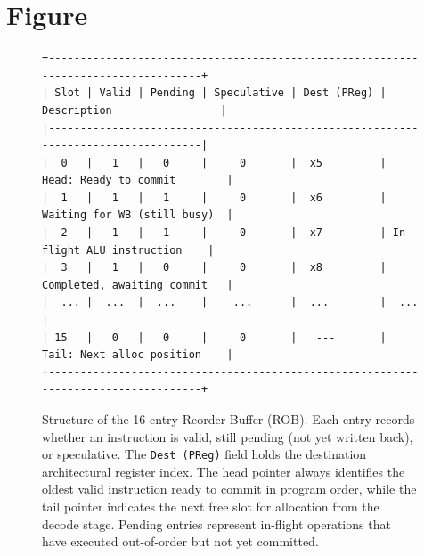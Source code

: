 \documentclass[11pt,a4paper]{article}
\begin{document}
\section{Figure}
\begin{figure}[H]
\centering
\begin{verbatim}
+-----------------------------------------------------------------------------------+
| Slot | Valid | Pending | Speculative | Dest (PReg) | Description                 |
|-----------------------------------------------------------------------------------|
|  0   |   1   |   0     |     0       |  x5         | Head: Ready to commit        |
|  1   |   1   |   1     |     0       |  x6         | Waiting for WB (still busy)  |
|  2   |   1   |   1     |     0       |  x7         | In-flight ALU instruction    |
|  3   |   1   |   0     |     0       |  x8         | Completed, awaiting commit   |
|  ... |  ...  |  ...    |    ...      |  ...        |  ...                         |
| 15   |   0   |   0     |     0       |   ---       | Tail: Next alloc position    |
+-----------------------------------------------------------------------------------+
\end{verbatim}
\caption{Structure of the 16-entry Reorder Buffer (ROB). 
Each entry records whether an instruction is valid, still pending (not yet written back), or speculative. 
The \texttt{Dest (PReg)} field holds the destination architectural register index. 
The head pointer always identifies the oldest valid instruction ready to commit in program order, 
while the tail pointer indicates the next free slot for allocation from the decode stage. 
Pending entries represent in-flight operations that have executed out-of-order but not yet committed.}
\end{figure}
\end{document}
